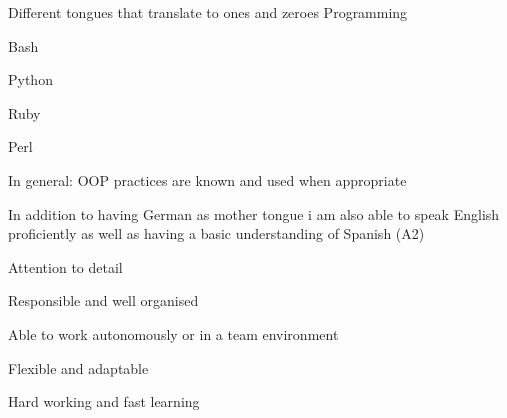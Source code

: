\begin{cventries}
  \cventry
    {Different tongues that translate to ones and zeroes}
    {Programming}
    {}
    {}
    {
      \begin{cvitems}
        \item Bash
        \item Python
        \item Ruby
        \item Perl
        \item In general: OOP practices are known and used when appropriate
      \end{cvitems}
    }

\end{cventries}


\begin{cvparagraph}
In addition to having German as mother tongue i am also able to speak English proficiently as well as having a basic understanding of Spanish (A2)
\end{cvparagraph}

\newline

\begin{cvparagraph}

\begin{cvitems}
  \item Attention to detail
  \item Responsible and well organised
  \item Able to work autonomously or in a team environment
  \item Flexible and adaptable
  \item Hard working and fast learning
\end{cvitems}
\end{cvparagraph}



